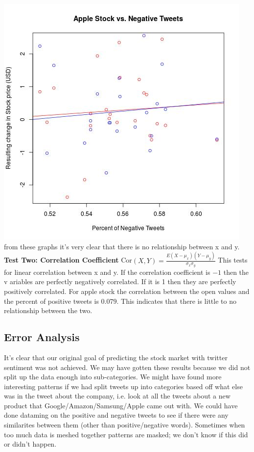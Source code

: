 \documentclass{acm_proc_article-sp}
\begin{document}
\begin{doublespace}
\newline\includegraphics[scale=.5]{apple_negative.jpeg} 
\newline\indent from these graphs it's very clear that there is no relationship between x and y. 
\newline\newline\textbf{Test Two: Correlation Coefficient}
\newline\indent Cor$(X,Y) = \frac{E ( X - \mu_x)(Y - \mu_y)}{\sigma_x\sigma_y}$
\newline\indent This tests for linear correlation between x and y. If the correlation coefficient is $-1$ then the v
ariables are perfectly negatively correlated. If it is 1 then they are perfectly positively correlated.
\newline\indent For apple stock the correlation between the open values and the percent of positive tweets is $0.079
$. This indicates that there is little to no relationship between the two. 


\subsection{Error Analysis}

It's clear that our original goal of predicting the stock market with twitter sentiment 
was not achieved. We may have gotten these results because we did not split up the data 
enough into sub-categories. We might have found more interesting patterns if we had split tweets
up into categories based off what else was in the tweet about the company, i.e. look at all the
tweets about a new product that Google/Amazon/Samsung/Apple came out with. We could have done dataming
on the positive and negative tweets to see if there were any similarites between them (other 
than positive/negative words). Sometimes when too much data is meshed together patterns are masked;
we don't know if this did or didn't happen. 


\end{doublespace}
\end{document}
